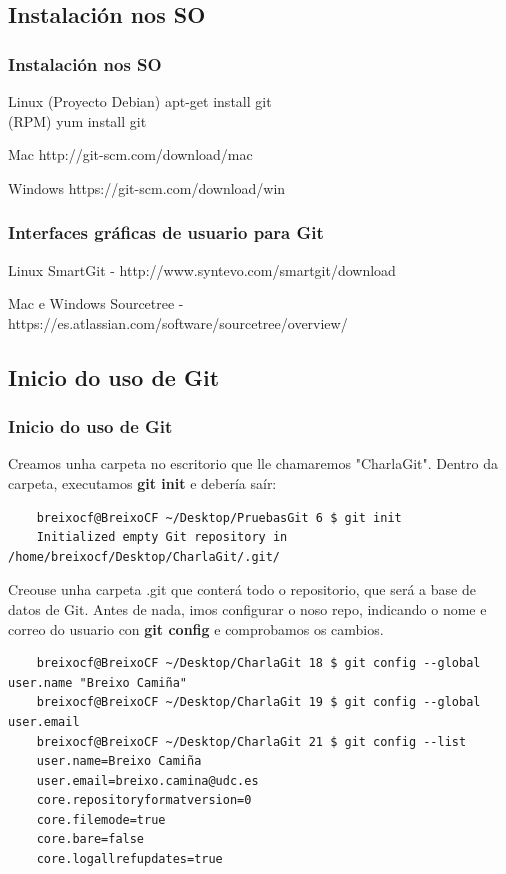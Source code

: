 \subsection{Instalación nos SO}
\begin{frame}
	\frametitle{Instalación nos SO}
	\begin{exampleblock}{Linux}
		(Proyecto Debian) apt-get install git\\
		(RPM) yum install git
	\end{exampleblock}
	\begin{block}{Mac}
		http://git-scm.com/download/mac
	\end{block}
	\begin{alertblock}{Windows}
		https://git-scm.com/download/win
	\end{alertblock}	
\end{frame}

\begin{frame}
	\frametitle{Interfaces gráficas de usuario para Git}
	\begin{exampleblock}{Linux}
			SmartGit - http://www.syntevo.com/smartgit/download
		\end{exampleblock}
		\begin{alertblock}{Mac e Windows}
			Sourcetree - https://es.atlassian.com/software/sourcetree/overview/
		\end{alertblock}
\end{frame}

\subsection{Inicio do uso de Git}
\begin{frame}[fragile]
	\frametitle{Inicio do uso de Git}
	\small
	Creamos unha carpeta no escritorio que lle chamaremos "CharlaGit".
	Dentro da carpeta, executamos \textbf{git init} e debería saír:
	\tiny
	\begin{verbatim}
	breixocf@BreixoCF ~/Desktop/PruebasGit 6 $ git init 
	Initialized empty Git repository in /home/breixocf/Desktop/CharlaGit/.git/
	\end{verbatim}
	\small
	Creouse unha carpeta .git que conterá todo o repositorio, que será a base de datos de Git.
	Antes de nada, imos configurar o noso repo, indicando o nome e correo do usuario con \textbf{git config}  e comprobamos os cambios.
	\tiny
	\begin{verbatim}
	breixocf@BreixoCF ~/Desktop/CharlaGit 18 $ git config --global user.name "Breixo Camiña"
	breixocf@BreixoCF ~/Desktop/CharlaGit 19 $ git config --global user.email 
	breixocf@BreixoCF ~/Desktop/CharlaGit 21 $ git config --list 
	user.name=Breixo Camiña
	user.email=breixo.camina@udc.es
	core.repositoryformatversion=0
	core.filemode=true
	core.bare=false
	core.logallrefupdates=true
	\end{verbatim}	
\end{frame}

